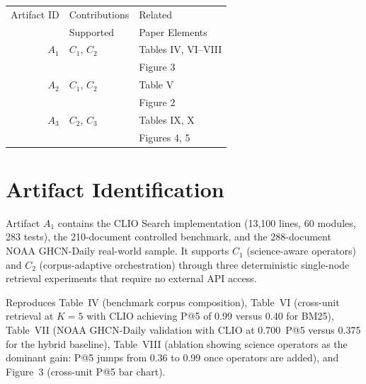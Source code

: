\documentclass[conference]{IEEEtran}
\begin{document}
\begin{center}
\begin{tabular}{rll}
\toprule
Artifact ID  &  Contributions &  Related \\
             &  Supported     &  Paper Elements \\
\midrule
$A_1$   &  $C_1$, $C_2$ & Tables IV, VI--VIII \\
        &               & Figure 3 \\
\midrule
$A_2$   &  $C_1$, $C_2$ & Table V \\
        &               & Figure 2 \\
\midrule
$A_3$   &  $C_2$, $C_3$ & Tables IX, X \\
        &               & Figures 4, 5 \\
\bottomrule
\end{tabular}
\end{center}


\section{Artifact Identification}


\newartifact

\artrel

Artifact $A_1$ contains the CLIO Search implementation (13{,}100 lines, 60 modules, 283 tests), the 210-document controlled benchmark, and the 288-document NOAA GHCN-Daily real-world sample. It supports $C_1$ (science-aware operators) and $C_2$ (corpus-adaptive orchestration) through three deterministic single-node retrieval experiments that require no external API access.

\artexp

Reproduces Table~IV (benchmark corpus composition), Table~VI (cross-unit retrieval at $K{=}5$ with CLIO achieving P@5 of 0.99 versus 0.40 for BM25), Table~VII (NOAA GHCN-Daily validation with CLIO at 0.700~P@5 versus 0.375 for the hybrid baseline), Table~VIII (ablation showing science operators as the dominant gain: P@5 jumps from 0.36 to 0.99 once operators are added), and Figure~3 (cross-unit P@5 bar chart).

\arttime
\end{document}
